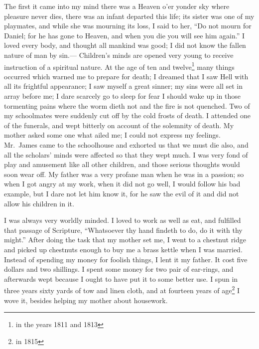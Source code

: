 The first it came into my mind there was a Heaven o'er yonder sky where pleasure never dies, there was an infant departed this life; its sister was one of my playmates, and while she was mourning its loss, I said to her, ``Do not mourn for Daniel; for he has gone to Heaven, and when you die you will see him again.''
I loved every body, and thought all mankind was good; I did not know the fallen nature of man by sin.---
Children's minds are opened very young to receive instruction of a spiritual nature.
At the age of ten and twelve\footnote{in the years 1811 and 1813} many things occurred which warned me to prepare for death; I dreamed that I saw Hell with all its frightful appearance; I saw myself a great sinner; my sins were all set in array before me; I dare scarcely go to sleep for fear I should wake up in those tormenting pains where the worm dieth not and the fire is not quenched.
Two of my schoolmates were suddenly cut off by the cold frosts of death.
I attended one of the funerals, and wept bitterly on account of the solemnity of death.
My mother asked some one what ailed me; I could not express my feelings.
Mr.\ James came to the schoolhouse and exhorted us that we must die also, and all the scholars' minds were affected so that they wept much.
I was very fond of play and amusement like all other children, and those serious thoughts would soon wear off.
My father was a very profane man when he was in a passion; so when I got angry at my work, when it did not go well, I would follow his bad example, but I dare not let him know it, for he saw the evil of it and did not allow his children in it.

I was always very worldly minded.
I loved to work as well as eat, and fulfilled that passage of Scripture, ``Whatsoever thy hand findeth to do, do it with thy might.''
After doing the task that my mother set me, I went to a chestnut ridge and picked up chestnuts enough to buy me a brass kettle when I was married.
Instead of spending my money for foolish things, I lent it my father.
It cost five dollars and two shillings.
I spent some money for two pair of ear-rings, and afterwards wept because I ought to have put it to some better use.
I spun in three years sixty yards of tow and linen cloth, and at fourteen years of age\footnote{in 1815} I wove it, besides helping my mother about housework.

